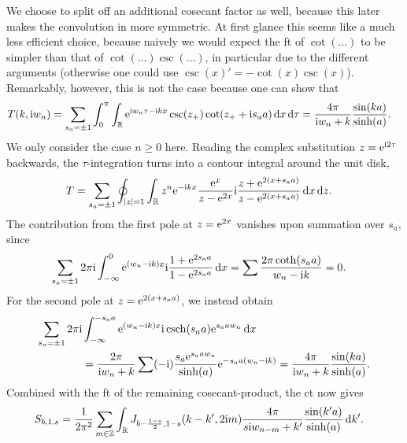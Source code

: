 We choose to split off an additional cosecant factor as well, because this later makes the convolution in \tpspace{} more symmetric.
At first glance this seems like a much less efficient choice, because naively we would expect the \gls{ft} of $\cot(\dots)$ to be simpler than that of $\cot(\dots)\csc(\dots)$, in particular due to the different arguments (otherwise one could use $\csc(x)'=-\cot(x)\csc(x)$).\\
Remarkably, however, this is not the case because one can show that
\begin{align*}
T(k,\text{i} w_n) &= \sum_{s_a=\pm 1} \int_{0}^{\pi} \int_{\mathbb{R}} \text{e}^{\text{i} w_n \tau - \text{i} kx} \csc(z_+) \cot(z_+ + \text{i} s_aa) \, \mathrm{d}x  \,\mathrm{d}\tau = \frac{4\pi}{\text{i} w_n + k} \frac{\sin(ka)}{\sinh(a)}.
\end{align*}
We only consider the case $n\ge 0$ here.
Reading the complex substitution $z=\text{e}^{\text{i} 2\tau}$ backwards, the $\tau$-integration turns into a contour integral around the unit disk,
\begin{align*}
T&= \sum_{s_a=\pm 1} \oint_{|z|=1} \int_{\mathbb{R}}  z^n\text{e}^{- \text{i} kx} \frac{\text{e}^{x}}{z - \text{e}^{2x}} \text{i} \frac{z + \text{e}^{2(x+s_aa)}}{z - \text{e}^{2(x+s_aa)}}  \, \mathrm{d}x \,\text{d} z.
\end{align*}
The contribution from the first pole at $z=\text{e}^{2x}$ vanishes upon summation over $s_a$, since
\begin{align*}
\sum_{s_a=\pm 1} 2\pi\text{i} \int_{-\infty}^{0} \text{e}^{(w_n-\text{i} k)x} \text{i} \frac{1 + \text{e}^{2s_aa}}{1 - \text{e}^{2s_aa}} \,\mathrm{d}x &= \sum \frac{2\pi \coth(s_aa)}{w_n -\text{i} k} = 0.
\end{align*}
For the second pole at $z=\text{e}^{2(x+s_aa)}$, we instead obtain
\begin{align*}
\sum_{s_a=\pm 1} 2\pi\i &\intx{-\infty}{-s_aa}{\powe{(w_n-\i k)x} \i\csch(s_aa) \powe{s_aaw_n}}{x} \\
&= \frac{2\pi}{\i w_n + k} \sum (-\i) \frac{s_a\powe{s_aaw_n}}{\sinh(a)} \powe{-s_aa(w_n-\i k)} = \frac{4\pi}{\i w_n + k} \frac{\sin(ka)}{\sinh(a)}.
\end{align*}
Combined with the \gls{ft} of the remaining cosecant-product, the \gls{ct} now gives
\begin{align*}
S_{b,1,s} &= \frac{1}{2\pi^2} \sum_{m\in\mathbb{Z}} \int_{\mathbb{R}}  J_{b - \frac{1-s}{2},1-s}(k-k', 2\text{i} m) \frac{4\pi}{s\text{i} w_{n-m} + k'} \frac{\sin(k'a)}{\sinh(a)} \, \mathrm{d}k'.
\end{align*}
